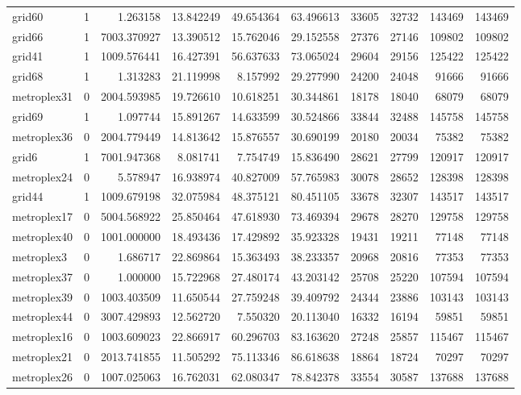 \begin{longtable}{|l|r|r|r|r|r|r|r|r|r|}
grid60 & 1 & 1.263158 & 13.842249 & 49.654364 & 63.496613 & 33605 & 32732 & 143469 & 143469 \\
grid66 & 1 & 7003.370927 & 13.390512 & 15.762046 & 29.152558 & 27376 & 27146 & 109802 & 109802 \\
grid41 & 1 & 1009.576441 & 16.427391 & 56.637633 & 73.065024 & 29604 & 29156 & 125422 & 125422 \\
grid68 & 1 & 1.313283 & 21.119998 & 8.157992 & 29.277990 & 24200 & 24048 & 91666 & 91666 \\
metroplex31 & 0 & 2004.593985 & 19.726610 & 10.618251 & 30.344861 & 18178 & 18040 & 68079 & 68079 \\
grid69 & 1 & 1.097744 & 15.891267 & 14.633599 & 30.524866 & 33844 & 32488 & 145758 & 145758 \\
metroplex36 & 0 & 2004.779449 & 14.813642 & 15.876557 & 30.690199 & 20180 & 20034 & 75382 & 75382 \\
grid6 & 1 & 7001.947368 & 8.081741 & 7.754749 & 15.836490 & 28621 & 27799 & 120917 & 120917 \\
metroplex24 & 0 & 5.578947 & 16.938974 & 40.827009 & 57.765983 & 30078 & 28652 & 128398 & 128398 \\
grid44 & 1 & 1009.679198 & 32.075984 & 48.375121 & 80.451105 & 33678 & 32307 & 143517 & 143517 \\
metroplex17 & 0 & 5004.568922 & 25.850464 & 47.618930 & 73.469394 & 29678 & 28270 & 129758 & 129758 \\
metroplex40 & 0 & 1001.000000 & 18.493436 & 17.429892 & 35.923328 & 19431 & 19211 & 77148 & 77148 \\
metroplex3 & 0 & 1.686717 & 22.869864 & 15.363493 & 38.233357 & 20968 & 20816 & 77353 & 77353 \\
metroplex37 & 0 & 1.000000 & 15.722968 & 27.480174 & 43.203142 & 25708 & 25220 & 107594 & 107594 \\
metroplex39 & 0 & 1003.403509 & 11.650544 & 27.759248 & 39.409792 & 24344 & 23886 & 103143 & 103143 \\
metroplex44 & 0 & 3007.429893 & 12.562720 & 7.550320 & 20.113040 & 16332 & 16194 & 59851 & 59851 \\
metroplex16 & 0 & 1003.609023 & 22.866917 & 60.296703 & 83.163620 & 27248 & 25857 & 115467 & 115467 \\
metroplex21 & 0 & 2013.741855 & 11.505292 & 75.113346 & 86.618638 & 18864 & 18724 & 70297 & 70297 \\
metroplex26 & 0 & 1007.025063 & 16.762031 & 62.080347 & 78.842378 & 33554 & 30587 & 137688 & 137688 \\

\end{longtable}
